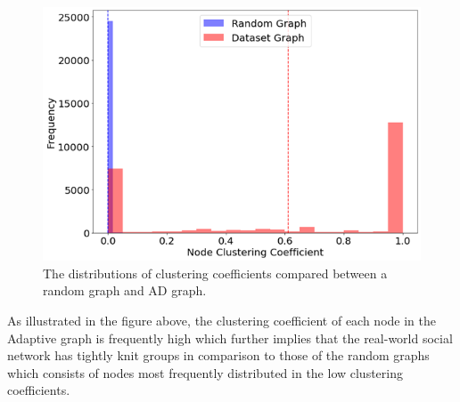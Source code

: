 \documentclass[conference]{IEEEtran}
\begin{document}
			\begin{figure}[htbp]
				\centerline{\includegraphics[width=\linewidth]{./images/random_ad_clustering.png}}
				\caption{The distributions of clustering coefficients compared between a random graph and AD graph.}
				\label{random_clustering}
			\end{figure}
			
			{
				As illustrated in the figure above, the clustering coefficient of each node in the Adaptive graph is frequently high which further implies that the real-world social network has tightly knit groups in comparison to those of the random graphs which consists of nodes most frequently distributed in the low clustering coefficients.
			\par}
		
\end{document}
